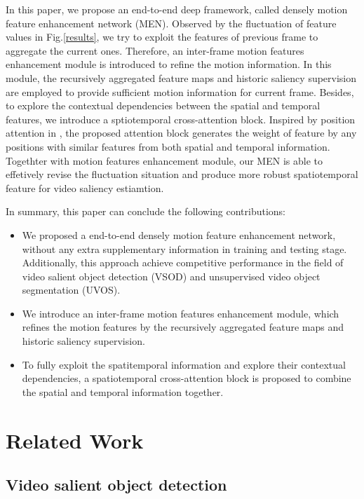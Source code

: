 \documentclass[12pt]{article}
\begin{document}
In this paper, we propose an end-to-end deep framework, called densely motion feature enhancement network (MEN). Observed by the fluctuation of feature values in Fig.\ref{results}, we try to exploit the features of previous frame to aggregate the current ones. Therefore, an inter-frame motion features enhancement module is introduced to refine the motion information. In this module, the recursively aggregated feature maps and historic saliency supervision are employed to provide sufficient motion information for current frame. Besides, to explore the contextual dependencies between the spatial and temporal features, we introduce a sptiotemporal cross-attention block. Inspired by position attention in \cite{}, the proposed attention block generates the weight of feature by any positions with similar features from both spatial and temporal information. Togethter with motion features enhancement module, our MEN is able to effetively revise the fluctuation situation and produce more robust spatiotemporal feature for video saliency estiamtion.

In summary, this paper can conclude the following contributions:

\begin{itemize}
  \item We proposed a end-to-end densely motion feature enhancement network, without any extra supplementary information in training and testing stage. Additionally, this approach achieve competitive performance in the field of video salient object detection (VSOD) and unsupervised video object segmentation (UVOS). 
  \item We introduce an inter-frame motion features enhancement module, which refines the motion features by the recursively aggregated feature maps and historic saliency supervision.
  \item To fully exploit the spatitemporal information and explore their contextual dependencies, a spatiotemporal cross-attention block is proposed to combine the spatial and temporal information together.	  
\end{itemize}
 

\section{Related Work}
\subsection{Video salient object detection}
\end{document}
